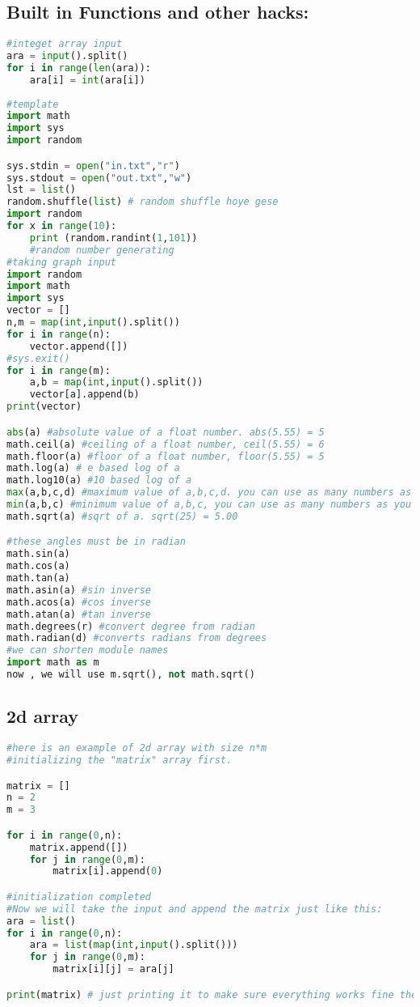 \documentclass[12pt]{article}
\begin{document}
\subsection{Built in Functions and other hacks:}
\begin{lstlisting}[language=Python,tabsize=3]
#integet array input
ara = input().split()
for i in range(len(ara)):
	ara[i] = int(ara[i])
	
#template
import math
import sys
import random

sys.stdin = open("in.txt","r")
sys.stdout = open("out.txt","w")
lst = list()
random.shuffle(list) # random shuffle hoye gese 
import random
for x in range(10):
    print (random.randint(1,101))
    #random number generating 
#taking graph input
import random 
import math 
import sys
vector = []
n,m = map(int,input().split())
for i in range(n):
	vector.append([])
#sys.exit()
for i in range(m):
	a,b = map(int,input().split())
	vector[a].append(b)
print(vector)

abs(a) #absolute value of a float number. abs(5.55) = 5
math.ceil(a) #ceiling of a float number, ceil(5.55) = 6
math.floor(a) #floor of a float number, floor(5.55) = 5
math.log(a) # e based log of a
math.log10(a) #10 based log of a
max(a,b,c,d) #maximum value of a,b,c,d. you can use as many numbers as you can
min(a,b,c) #minimum value of a,b,c, you can use as many numbers as you can 
math.sqrt(a) #sqrt of a. sqrt(25) = 5.00

#these angles must be in radian
math.sin(a)
math.cos(a)
math.tan(a)
math.asin(a) #sin inverse
math.acos(a) #cos inverse
math.atan(a) #tan inverse
math.degrees(r) #convert degree from radian
math.radian(d) #converts radians from degrees
#we can shorten module names
import math as m
now , we will use m.sqrt(), not math.sqrt()
\end{lstlisting}
\subsection{2d array}
\begin{lstlisting}[language=Python,tabsize=3]
#here is an example of 2d array with size n*m
#initializing the "matrix" array first. 

matrix = []
n = 2
m = 3

for i in range(0,n):
    matrix.append([])
    for j in range(0,m):
        matrix[i].append(0)

#initialization completed
#Now we will take the input and append the matrix just like this:
ara = list()
for i in range(0,n):
	ara = list(map(int,input().split()))
	for j in range(0,m):
		matrix[i][j] = ara[j]

print(matrix) # just printing it to make sure everything works fine there
\end{lstlisting}
\end{document}
